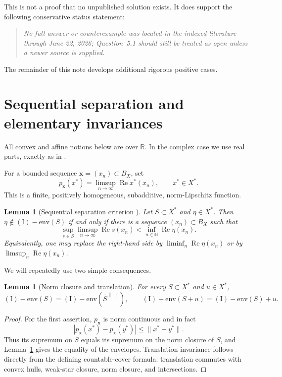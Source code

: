 \documentclass[11pt]{article}
\newtheorem{lemma}[theorem]{Lemma}
\theoremstyle{remark}
\newcommand{\Ienv}{\operatorname{(I)\!\!-env}}
\newcommand{\Ree}{\operatorname{Re}}
\newcommand{\R}{\mathbb{R}}
\newcommand{\N}{\mathbb{N}}
\begin{document}
This is not a proof that no unpublished solution exists.  It does support
the following conservative status statement:

\begin{quote}
\emph{No full answer or counterexample was located in the indexed literature
through June 22, 2026; Question~5.1 should still be treated as open unless a
newer source is supplied.}
\end{quote}

The remainder of this note develops additional rigorous positive cases.

\section{Sequential separation and elementary invariances}

All convex and affine notions below are over $\R$.  In the complex case we
use real parts, exactly as in \cite[Lemma~2.1]{KR}.

For a bounded sequence $\mathbf{x}=(x_n)\subset B_X$, set
\[
 p_{\mathbf{x}}(x^*)=\limsup_{n\to\infty}\Ree x^*(x_n),
 \qquad x^*\in X^*.
\]
This is a finite, positively homogeneous, subadditive, norm-Lipschitz
function.

\begin{lemma}[Sequential separation criterion \cite{Kalenda2007,KR}]
\label{lem:separation}
Let $S\subset X^*$ and $\eta\in X^*$.  Then $\eta\notin\Ienv(S)$ if and
only if there is a sequence $(x_n)\subset B_X$ such that
\[
\tag{3.1}\label{strongsep}
 \sup_{s\in S}\limsup_{n\to\infty}\Ree s(x_n)
 <\inf_{n\in\N}\Ree\eta(x_n).
\]
Equivalently, one may replace the right-hand side by
$\liminf_n\Ree\eta(x_n)$ or by $\limsup_n\Ree\eta(x_n)$.
\end{lemma}

We will repeatedly use two simple consequences.

\begin{lemma}[Norm closure and translation]
\label{lem:invariance}
For every $S\subset X^*$ and $u\in X^*$,
\[
 \Ienv(S)=\Ienv(\overline S^{\|\cdot\|}),
 \qquad
 \Ienv(S+u)=\Ienv(S)+u.
\]
\end{lemma}

\begin{proof}
For the first assertion, $p_{\mathbf{x}}$ is norm continuous and in fact
\[
 |p_{\mathbf{x}}(x^*)-p_{\mathbf{x}}(y^*)|
 \leq \|x^*-y^*\|.
\]
Thus its supremum on $S$ equals its supremum on the norm closure of $S$,
and Lemma~\ref{lem:separation} gives the equality of the envelopes.
Translation invariance follows directly from the defining countable-cover
formula: translation commutes with convex hulls, weak-star closure, norm
closure, and intersections.
\end{proof}
\end{document}
